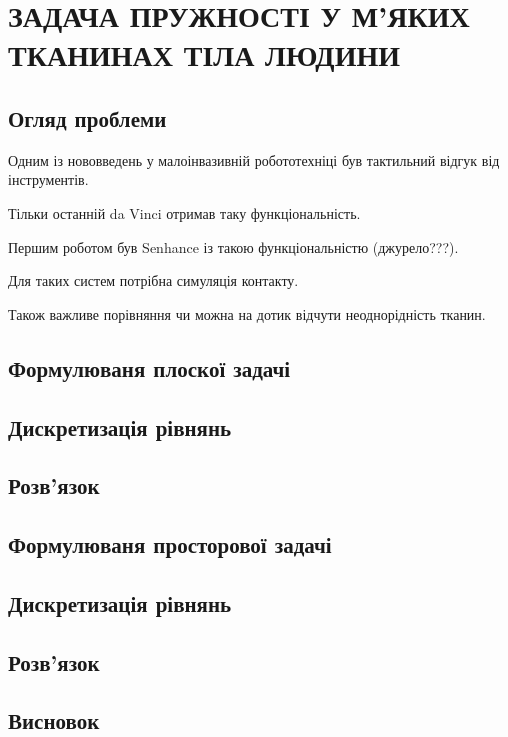 \chapter{ЗАДАЧА ПРУЖНОСТІ У М'ЯКИХ ТКАНИНАХ ТІЛА ЛЮДИНИ}

\nocite{bahvalov-et-al,benerdge-et-al,lung-cancer} 

\section{Огляд проблеми}

Одним із нововведень у малоінвазивній робототехніці був тактильний відгук від інструментів.

Тільки останній da Vinci отримав таку функціональність.

Першим роботом був Senhance із такою функціональністю (джурело???).

Для таких систем потрібна симуляція контакту.

Також важливе порівняння чи можна на дотик відчути неоднорідність тканин.


\section{Формулюваня плоскої задачі}

\section{Дискретизація рівнянь}

\section{Розв'язок}

\section{Формулюваня просторової задачі}

\section{Дискретизація рівнянь}

\section{Розв'язок}

\section{Висновок}
